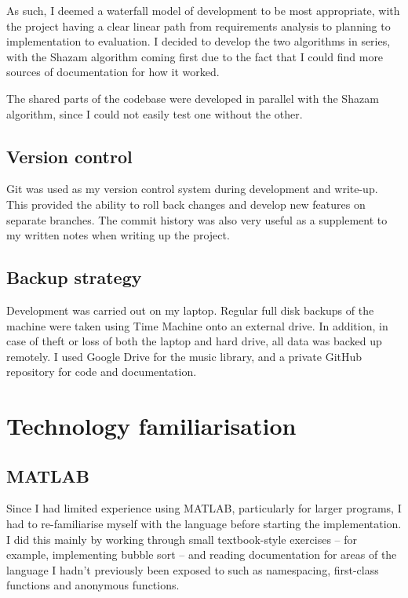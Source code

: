 \documentclass[12pt,a4paper,twoside,openright]{report}
\begin{document}
As such, I deemed a waterfall model of development to be most appropriate, with the project having a clear linear path from requirements analysis to planning to implementation to evaluation. I decided to develop the two algorithms in series, with the Shazam algorithm coming first due to the fact that I could find more sources of documentation for how it worked.

The shared parts of the codebase were developed in parallel with the Shazam algorithm, since I could not easily test one without the other.


\subsection{Version control}

Git was used as my version control system during development and write-up. This provided the ability to roll back changes and develop new features on separate branches. The commit history was also very useful as a supplement to my written notes when writing up the project.


\subsection{Backup strategy}

Development was carried out on my laptop. Regular full disk backups of the machine were taken using Time Machine onto an external drive. In addition, in case of theft or loss of both the laptop and hard drive, all data was backed up remotely. I used Google Drive for the music library, and a private GitHub repository for code and documentation.




\section{Technology familiarisation}

\subsection{MATLAB}

Since I had limited experience using MATLAB, particularly for larger programs, I had to re-familiarise myself with the language before starting the implementation. I did this mainly by working through small textbook-style exercises -- for example, implementing bubble sort -- and reading documentation for areas of the language I hadn't previously been exposed to such as namespacing, first-class functions and anonymous functions.
\end{document}
